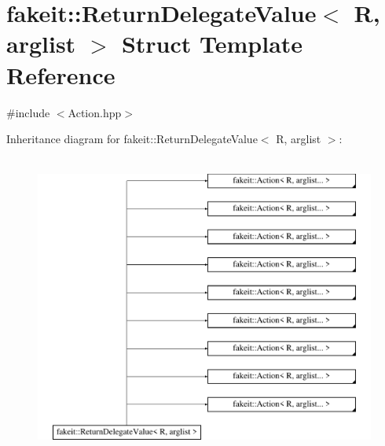 \hypertarget{structfakeit_1_1ReturnDelegateValue}{}\section{fakeit\+::Return\+Delegate\+Value$<$ R, arglist $>$ Struct Template Reference}
\label{structfakeit_1_1ReturnDelegateValue}


{\ttfamily \#include $<$Action.\+hpp$>$}

Inheritance diagram for fakeit\+::Return\+Delegate\+Value$<$ R, arglist $>$\+:\begin{figure}[H]
\begin{center}
\leavevmode
\includegraphics[height=10.000000cm]{structfakeit_1_1ReturnDelegateValue}
\end{center}
\end{figure}
